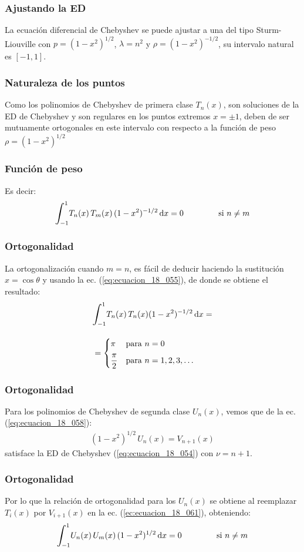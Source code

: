 \documentclass[12pt]{beamer}
\begin{document}
\begin{frame}
\frametitle{Ajustando la ED}
La ecuación diferencial de Chebyshev se puede ajustar a una del tipo Sturm-Liouville con $p = (1 - x^{2})^{1/2}$, $\lambda = n^{2}$ y $\rho = (1 - x^{2})^{-1/2}$, su intervalo natural es $[-1, 1]$.
\end{frame}
\begin{frame}
\frametitle{Naturaleza de los puntos}
Como los polinomios de Chebyshev de primera clase $T_{n}(x)$, son soluciones de la ED de Chebyshev y son regulares en los puntos extremos $x = \pm 1$, \pause deben de ser mutuamente ortogonales en este intervalo con respecto a la función de peso $\rho = (1 - x^{2})^{1/2}$
\end{frame}
\begin{frame}
\frametitle{Función de peso}
Es decir:
\pause
\begin{align}
\scaleint{6ex}_{\bs -1}^{1} T_{n}(x) \, T_{m}(x) \, (1 - x^{2})^{-1/2} \dd{x} = 0 \hspace{1.5cm} \mbox{si  } n \neq m
\label{ec:ecuacion_18_061}
\end{align}
\end{frame}
\begin{frame}
\frametitle{Ortogonalidad}
La ortogonalización cuando $m = n$, es fácil de deducir haciendo la sustitución $x = \cos \theta$ y usando la ec. (\ref{eq:ecuacion_18_055}), de donde se obtiene el resultado:
\pause
\begin{align}
\begin{aligned}
&\scaleint{6ex}_{\bs -1}^{1} T_{n} (x) \, T_{n} (x) (1 - x^{2})^{-1/2} \dd{x} = \\[1em]
&= \begin{cases}
\pi & \mbox{para  } n = 0 \\[0.5em]
\dfrac{\pi}{2} & \mbox{para  } n = 1, 2, 3, \ldots
\end{cases}
\end{aligned}
\label{eq:ecuacion_18_062}
\end{align}
\end{frame}
\begin{frame}
\frametitle{Ortogonalidad}
Para los polinomios de Chebyshev de segunda clase $U_{n}(x)$, vemos que de la ec. (\ref{eq:ecuacion_18_058}):
\pause
\begin{align*}
(1 - x^{2})^{1/2} \, U_{n} (x) = V_{n+1} (x)
\end{align*}
satisface la ED de Chebyshev (\ref{eq:ecuacion_18_054}) con $\nu = n + 1$.
\end{frame}
\begin{frame}
\frametitle{Ortogonalidad}
Por lo que la relación de ortogonalidad para los $U_{n} (x)$ se obtiene al reemplazar $T_{i}(x)$ por $V_{i+1} (x)$ en la ec. (\ref{ec:ecuacion_18_061}), obteniendo:
\pause
\begin{align*}
\scaleint{6ex}_{\bs -1}^{1} U_{n}(x) \, U_{m}(x) \, (1 - x^{2})^{1/2} \dd{x} = 0 \hspace{1.5cm} \mbox{si  } n \neq m
\end{align*}
\end{frame}
\end{document}
